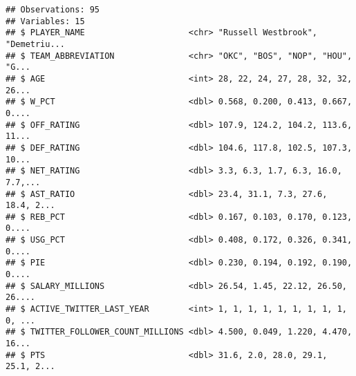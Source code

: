 \documentclass[]{article}
\newenvironment{Shaded}{\begin{snugshade}}{\end{snugshade}}
\newcommand{\CommentTok}[1]{\textcolor[rgb]{0.56,0.35,0.01}{\textit{#1}}}
\newcommand{\KeywordTok}[1]{\textcolor[rgb]{0.13,0.29,0.53}{\textbf{#1}}}
\newcommand{\NormalTok}[1]{#1}
\newcommand{\OperatorTok}[1]{\textcolor[rgb]{0.81,0.36,0.00}{\textbf{#1}}}
\newcommand{\StringTok}[1]{\textcolor[rgb]{0.31,0.60,0.02}{#1}}
\begin{document}
\begin{Shaded}
\end{Shaded}

\begin{verbatim}
## Observations: 95
## Variables: 15
## $ PLAYER_NAME                     <chr> "Russell Westbrook", "Demetriu...
## $ TEAM_ABBREVIATION               <chr> "OKC", "BOS", "NOP", "HOU", "G...
## $ AGE                             <int> 28, 22, 24, 27, 28, 32, 32, 26...
## $ W_PCT                           <dbl> 0.568, 0.200, 0.413, 0.667, 0....
## $ OFF_RATING                      <dbl> 107.9, 124.2, 104.2, 113.6, 11...
## $ DEF_RATING                      <dbl> 104.6, 117.8, 102.5, 107.3, 10...
## $ NET_RATING                      <dbl> 3.3, 6.3, 1.7, 6.3, 16.0, 7.7,...
## $ AST_RATIO                       <dbl> 23.4, 31.1, 7.3, 27.6, 18.4, 2...
## $ REB_PCT                         <dbl> 0.167, 0.103, 0.170, 0.123, 0....
## $ USG_PCT                         <dbl> 0.408, 0.172, 0.326, 0.341, 0....
## $ PIE                             <dbl> 0.230, 0.194, 0.192, 0.190, 0....
## $ SALARY_MILLIONS                 <dbl> 26.54, 1.45, 22.12, 26.50, 26....
## $ ACTIVE_TWITTER_LAST_YEAR        <int> 1, 1, 1, 1, 1, 1, 1, 1, 1, 0, ...
## $ TWITTER_FOLLOWER_COUNT_MILLIONS <dbl> 4.500, 0.049, 1.220, 4.470, 16...
## $ PTS                             <dbl> 31.6, 2.0, 28.0, 29.1, 25.1, 2...
\end{verbatim}
\end{document}
